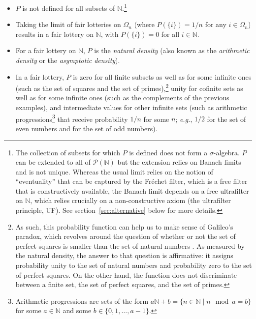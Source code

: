 \begin{itemize}
  \item $P$ is not defined for all subsets of $\mathbb{N}$.\footnote{The collection of subsets for which $P$ is defined does not form a $\sigma$-algebra. $P$ can be extended to all of $\mathcal{P}(\mathbb{N})$ but the extension relies on Banach limits and is not unique. Whereas the usual limit relies on the notion of ``eventuality'' that can be captured by the Fr\'{e}chet filter, which is a free filter that is constructively available, the Banach limit depends on a free ultrafilter on $\mathbb{N}$, which relies crucially on a non-constructive axiom (the ultrafilter principle, UF). See section~\ref{sec:alternative} below for more details.}
  \item Taking the limit of fair lotteries on $\Omega_n$ (where $P(\{i\})=1/n$ for any $i \in \Omega_n$) results in a fair lottery on $\mathbb{N}$, with $P(\{i\})=0$ for all $i \in \mathbb{N}$.
  \item For a fair lottery on $\mathbb{N}$, $P$ is the \textit{natural density} (also known as the \textit{arithmetic density} or the \textit{asymptotic density}).
  \item In a fair lottery, $P$ is zero for all finite subsets as well as for some infinite ones (such as the set of squares and the set of primes),\footnote{As such, this probability function can help us to make sense of Galileo's paradox, which revolves around the question of whether or not the set of perfect squares is smaller than the set of natural numbers \citep[see][]{Mancosu:2009}. As measured by the natural density, the answer to that question is affirmative: it assigns probability unity to the set of natural numbers and probability zero to the set of perfect squares. On the other hand, the function does not discriminate between a finite set, the set of perfect squares, and the set of primes.} unity for cofinite sets as well as for some infinite ones (such as the complements of the previous examples), and intermediate values for other infinite sets (such as arithmetic progressions\footnote{Arithmetic progressions are sets of the form $a\mathbb{N}+b = \{ n \in \mathbb{N} \mid n \mod a = b \}$ for some $a \in \mathbb{N}$ and some $b \in \{0,1,\ldots,a-1\}$.} that receive probability $1/n$ for some $n$; \textit{e.g.}, $1/2$ for the set of even numbers and for the set of odd numbers).
\end{itemize}

